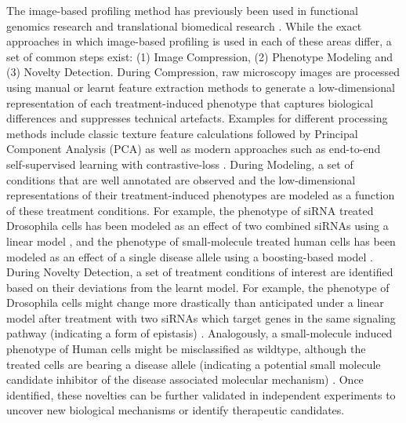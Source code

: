 \begin{flushleft}
The image-based profiling method has previously been used in functional genomics research \citep{billmannGeneticInteractionMap2016} and translational biomedical research \citep{gibsonStrategyIdentifyingRepurposed2015}. While the exact approaches in which image-based profiling is used in each of these areas differ, a set of common steps exist: (1) Image Compression, (2) Phenotype Modeling and (3) Novelty Detection. During Compression, raw microscopy images are processed using manual or learnt feature extraction methods to generate a low-dimensional representation of each treatment-induced phenotype that captures biological differences and suppresses technical artefacts. Examples for different processing methods include classic texture feature calculations followed by Principal Component Analysis (PCA) \citep{caicedoDataanalysisStrategiesImagebased2017} as well as modern approaches such as end-to-end self-supervised learning with contrastive-loss \citep{perakisContrastiveLearningSingleCell2021}. During Modeling, a set of conditions that are well annotated are observed and the low-dimensional representations of their treatment-induced phenotypes are modeled as a function of these treatment conditions. For example, the phenotype of siRNA treated Drosophila cells has been modeled as an effect of two combined siRNAs using a linear model \citep{billmannGeneticInteractionMap2016}, and the phenotype of small-molecule treated human cells has been modeled as an effect of a single disease allele using a boosting-based model \citep{gibsonStrategyIdentifyingRepurposed2015}. During Novelty Detection, a set of treatment conditions of interest are identified based on their deviations from the learnt model. For example, the phenotype of Drosophila cells might change more drastically than anticipated under a linear model after treatment with two siRNAs which target genes in the same signaling pathway (indicating a form of epistasis) \citep{billmannGeneticInteractionMap2016}. Analogously, a small-molecule induced phenotype of Human cells might be misclassified as wildtype, although the treated cells are bearing a disease allele (indicating a potential small molecule candidate inhibitor of the disease associated molecular mechanism) \citep{gibsonStrategyIdentifyingRepurposed2015}. Once identified, these novelties can be further validated in independent experiments to uncover new biological mechanisms or identify therapeutic candidates.
\par



\end{flushleft}
